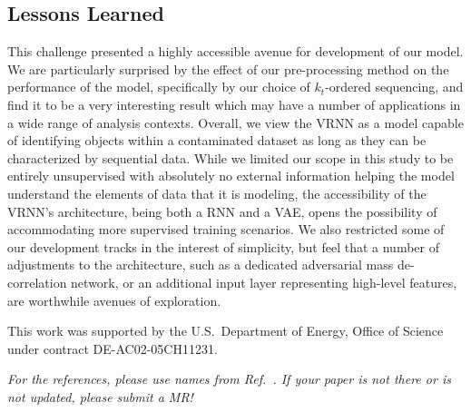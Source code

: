 \documentclass[letterpaper,11pt]{article}
\begin{document}
\subsection{Lessons Learned}
\label{sec:lessons}


This challenge presented a highly accessible avenue for development of our model. We are particularly surprised by the effect of our pre-processing method on the performance of the model, specifically by our choice of $k_{t}$-ordered sequencing, and find it to be a very interesting result which may have a number of applications in a wide range of analysis contexts. Overall, we view the VRNN as a model capable of identifying objects within a contaminated dataset as long as they can be characterized by sequential data. While we limited our scope in this study to be entirely unsupervised with absolutely no external information helping the model understand the elements of data that it is modeling, the accessibility of the VRNN's architecture, being both a RNN and a VAE, opens the possibility of accommodating more supervised training scenarios. We also restricted some of our development tracks in the interest of simplicity, but feel that a number of adjustments to the architecture, such as a dedicated adversarial mass de-correlation network, or an additional input layer representing high-level features, are worthwhile avenues of exploration.



\acknowledgments

This work was supported by the U.S.~Department of Energy, Office of Science under contract DE-AC02-05CH11231. 

\vspace{10mm}

\noindent \textit{For the references, please use names from Ref.~\cite{hepmllivingreview}.  If your paper is not there or is not updated, please submit a MR!}



\end{document}
